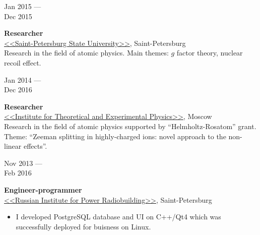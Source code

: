 \documentclass[10pt,a4paper]{article}
\newcommand{\lmpratio}{0.15}
\newcommand{\rmpratio}{0.74}
\newcommand{\vSpace}{0.5cm}
\newcommand{\horizontalSpace}{0.05\textwidth}
\newcommand{\sectionMain}[1]{\textbf{#1}}
\begin{document}
	\begin{minipage}[t]{\lmpratio\textwidth}
		Jan 2015 --- \\Dec 2015
	\end{minipage}
	\hspace{\horizontalSpace}
	\begin{minipage}[t]{\rmpratio\textwidth}
		\sectionMain{Researcher}\\
		\href{http://english.spbu.ru/}{<<Saint-Petersburg State University>>}, Saint-Petersburg\\[0.5cm]		
		Research in the field of atomic physics. 
		Main themes: $g$ factor theory, nuclear recoil effect. \\

	\end{minipage}
	\vspace{\vSpace}

	\begin{minipage}[t]{\lmpratio\textwidth}
		Jan 2014 --- \\Dec 2016
	\end{minipage}
	\hspace{\horizontalSpace}
	\begin{minipage}[t]{\rmpratio\textwidth}
		\sectionMain{Researcher}\\
		\href{http://frrc.itep.ru/index.php/en/}{<<Institute for Theoretical and Experimental Physics>>}, Moscow\\[0.5cm]
		Research in the field of atomic physics supported by ``Helmholtz-Rosatom'' grant. 
		Theme: ``Zeeman splitting in highly-charged ions: novel approach to the non-linear effects''. \\[0.5cm]
		
	\end{minipage}
	
	\vspace{\vSpace}

	\begin{minipage}[t]{\lmpratio\textwidth}
		Nov 2013 --- \\Feb 2016
	\end{minipage}
	\hspace{\horizontalSpace}
	\begin{minipage}[t]{\rmpratio\textwidth}
		\sectionMain{Engineer-programmer}\\
		\href{http://www.rimr.ru/eng/}{<<Russian Institute for Power Radiobuilding>>}, Saint-Petersburg\\[0.5cm]
            \begin{itemize}
                \item
I developed PostgreSQL database and UI on C++/Qt4 which was successfully deployed for buisness on Linux.
            \end{itemize}

	\end{minipage}
\end{document}
